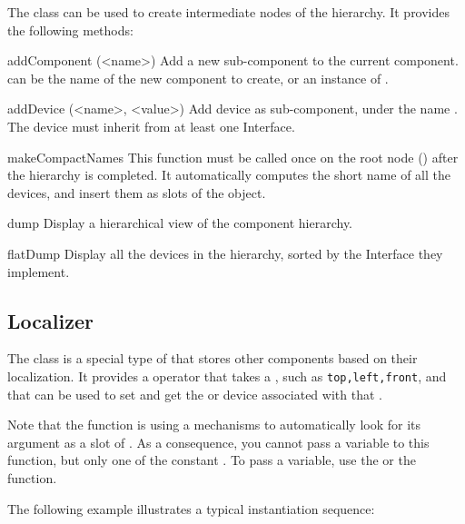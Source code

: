 The  class can be used to create intermediate nodes of the
hierarchy. It provides the following methods:

\begin{urbiscriptapi}

\item[addComponent](<name>)%
  Add a new sub-component to the current component.  can
  be the name of the new component to create, or an instance of
  .

\item[addDevice](<name>, <value>)%
  Add device  as sub-component, under the name . The
  device must inherit from at least one Interface.

\item[makeCompactNames]%
  This function must be called once on the root node ()
  after the hierarchy is completed.  It automatically computes the
  short name of all the devices, and insert them as slots of the
   object.

\item[dump]%
  Display a hierarchical view of the component hierarchy.

\item[flatDump]%
  Display all the devices in the hierarchy, sorted by the Interface
  they implement.
\end{urbiscriptapi}

\subsection{Localizer}

The  class is a special type of  that stores
other components based on their localization. It provides a \code{[]} operator
that takes a , such as \lstinline|top,left,front|, and that
can be used to set and get the  or device associated with
that .

Note that the \code{[]} function is using a mechanisms to automatically look
for its argument as a slot of . As a consequence, you cannot
pass a variable to this function, but only one of the constant
.
To pass a variable, use the  or the 
function.

The following example illustrates a typical instantiation sequence:

